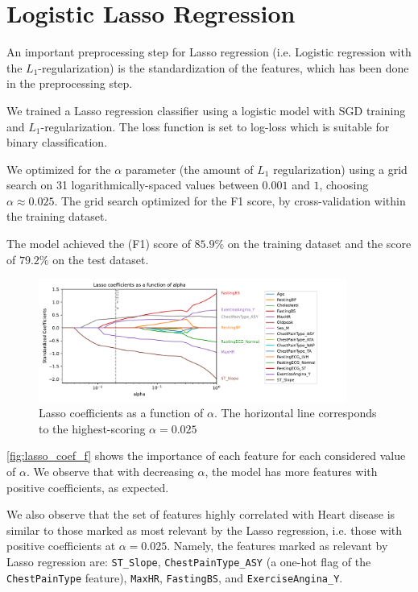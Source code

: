 \section{Logistic Lasso Regression}
\label{sec:p1q2}

An important preprocessing step for Lasso regression (i.e. Logistic regression with the $L_1$-regularization) is the standardization of the features, which has been done in the preprocessing step.

We trained a Lasso regression classifier using a logistic model with SGD training and $L_1$-regularization. The loss function is set to log-loss which is suitable for binary classification.

We optimized for the $\alpha$ parameter (the amount of $L_1$ regularization) using a grid search on 31 logarithmically-spaced values between $0.001$ and $1$, choosing $\alpha\approx 0.025$. The grid search optimized for the F1 score, by cross-validation within the training dataset.

The model achieved the (F1) score of $85.9\%$ on the training dataset and the score of $79.2\%$ on the test dataset.

\begin{figure}
    \centering
    \includegraphics[width=0.9\textwidth]{images/lasso_coef_f.pdf}
    \caption{Lasso coefficients as a function of $\alpha$. The horizontal line corresponds to the highest-scoring $\alpha=0.025$}
    \label{fig:lasso_coef_f}
\end{figure}

\autoref{fig:lasso_coef_f} shows the importance of each feature for each considered value of $\alpha$. We observe that with decreasing $\alpha$, the model has more features with positive coefficients, as expected.

We also observe that the set of features highly correlated with Heart disease is similar to those marked as most relevant by the Lasso regression, i.e. those with positive coefficients at $\alpha=0.025$. Namely, the features marked as relevant by Lasso regression are: \texttt{ST\_Slope}, \texttt{ChestPainType\_ASY} (a one-hot flag of the \texttt{ChestPainType} feature), \texttt{MaxHR}, \texttt{FastingBS}, and \texttt{ExerciseAngina\_Y}.

